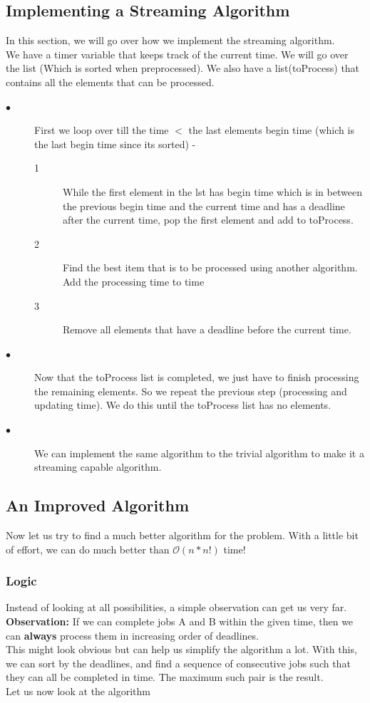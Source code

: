 \documentclass[11pt]{article}
\begin{document}
{				\subsection{Implementing a Streaming Algorithm}
				In this section, we will go over how we implement the streaming algorithm.\\
				We have a timer variable that keeps track of the current time. We will go over the list (Which is sorted when preprocessed). We also have a list(toProcess) that contains all the elements that can be processed.
				
				\begin{description}
					\item[$\bullet$] First we loop over till the time $<$ the last elements begin time (which is the last begin time since its sorted) - 
					\begin{description}
						\item[1] While the first element in the lst has begin time which is in between the previous begin time and the current time and has a deadline after the current time, pop the first element and add to toProcess.
						\item[2] Find the best item that is to be processed using another algorithm. Add the processing time to time
						\item[3] Remove all elements that have a deadline before the current time.
					\end{description}
					\item[$\bullet$] Now that the toProcess list is completed, we just have to finish processing the remaining elements. So we repeat the previous step (processing and updating time). We do this until the toProcess list has no elements.
					\item[$\bullet$] We can implement the same algorithm to the trivial algorithm to make it a streaming capable algorithm.
				\end{description}
				
				\subsection{An Improved Algorithm}
				Now let us try to find a much better algorithm for the problem. With a little bit of effort, we can do much better than $\mathcal{O}(n*n!)$ time!
				
				\subsubsection{Logic}
				Instead of looking at all possibilities, a simple observation can get us very far.\\
				\textbf{Observation:} If we can complete jobs A and B within the given time, then we can \textbf{always} process them in increasing order of deadlines.\\
				This might look obvious but can help us simplify the algorithm a lot. With this, we can sort by the deadlines, and find a sequence of consecutive jobs such that they can all be completed in time. The maximum such pair is the result.
				\\ Let us now look at the algorithm
				
}
\end{document}
